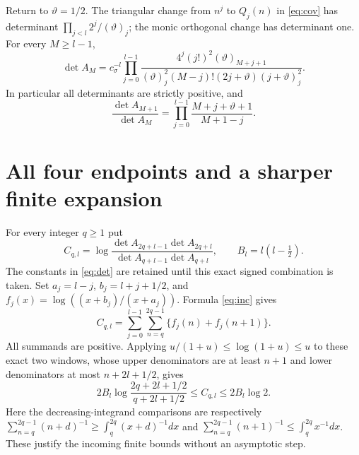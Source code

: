 \documentclass[11pt,a4paper]{article}
\begin{document}
Return to $\vartheta=1/2$. The triangular change from $n^j$ to $Q_j(n)$
in \eqref{eq:cov} has determinant $\prod_{j<l}2^j/(\vartheta)_j$;
the monic orthogonal change has determinant one. For every $M\ge l-1$,
\begin{equation}\label{eq:det}
 \det A_M=c_\sigma^{-l}\prod_{j=0}^{l-1}
 \frac{4^j(j!)^2(\vartheta)_{M+j+1}}
 {(\vartheta)_j^2(M-j)!(2j+\vartheta)(j+\vartheta)_j^2}.
\end{equation}
In particular all determinants are strictly positive, and
\begin{equation}\label{eq:inc}
 \frac{\det A_{M+1}}{\det A_M}
 =\prod_{j=0}^{l-1}\frac{M+j+\vartheta+1}{M+1-j}.
\end{equation}

\section{All four endpoints and a sharper finite expansion}
For every integer $q\ge1$ put
\[
 C_{q,l}=\log\frac{\det A_{2q+l-1}\det A_{2q+l}}
 {\det A_{q+l-1}\det A_{q+l}},\qquad B_l=l(l-\tfrac12).
\]
The constants in \eqref{eq:det} are retained until this exact signed
combination is taken. Set $a_j=l-j$, $b_j=l+j+1/2$, and
$f_j(x)=\log((x+b_j)/(x+a_j))$. Formula \eqref{eq:inc} gives
\begin{equation}\label{eq:windows}
 C_{q,l}=\sum_{j=0}^{l-1}\sum_{n=q}^{2q-1}
                         \{f_j(n)+f_j(n+1)\}.
\end{equation}
All summands are positive. Applying
$u/(1+u)\le\log(1+u)\le u$ to these exact two windows, whose upper
denominators are at least $n+1$ and lower denominators at most
$n+2l+1/2$, gives
\[
 2B_l\log\frac{2q+2l+1/2}{q+2l+1/2}
 \le C_{q,l}\le2B_l\log2.
\]
Here the decreasing-integrand comparisons are respectively
$\sum_{n=q}^{2q-1}(n+d)^{-1}\ge\int_q^{2q}(x+d)^{-1}dx$ and
$\sum_{n=q}^{2q-1}(n+1)^{-1}\le\int_q^{2q}x^{-1}dx$.
These justify the incoming finite bounds without an asymptotic step.
\end{document}
